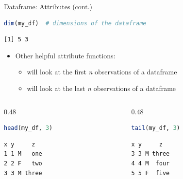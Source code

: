 \begin{frame}[fragile]{Dataframe: Attributes (cont.)}
\begin{lstlisting}[language=R]
dim(my_df)  # dimensions of the dataframe
\end{lstlisting}
\begin{lstlisting}[style=output]
[1] 5 3
\end{lstlisting}
\begin{itemize}
  \item Other helpful attribute functions:
  \begin{itemize}
    \item {} will look at the first \textit{n} observations of a dataframe
    \item {} will look at the last \textit{n} observations of a dataframe
  \end{itemize}
\end{itemize}
\begin{columns}[T]
\begin{column}{0.48\textwidth}
\begin{lstlisting}[language=R]
head(my_df, 3)
\end{lstlisting}
\begin{lstlisting}[style=output]
  x y     z
1 1 M   one
2 2 F   two
3 3 M three
\end{lstlisting}
\end{column}
\begin{column}{0.48\textwidth}
\begin{lstlisting}[language=R]
tail(my_df, 3)
\end{lstlisting}
\begin{lstlisting}[style=output]
  x y     z
3 3 M three
4 4 M  four
5 5 F  five
\end{lstlisting}
\end{column}
\end{columns}
\end{frame}

